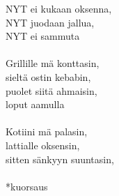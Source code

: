             NYT ei kukaan oksenna,  \\
            NYT juodaan jallua, \\
            NYT ei sammuta \\
\hspace{10mm} \\
            Grillille mä konttasin,  \\
            sieltä ostin kebabin, \\
            puolet siitä ahmaisin,  \\
            loput aamulla \\
\hspace{10mm} \\
            Kotiini mä palasin,  \\
            lattialle oksensin, \\
            sitten sänkyyn suuntasin, \\
\hspace{10mm} \\
            *kuorsaus \\
